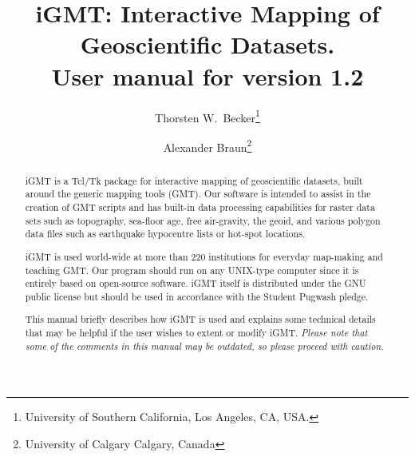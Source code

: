 \documentclass[11pt]{article}
\title{iGMT: Interactive Mapping of Geoscientific
  Datasets.\\User manual for version 1.2}
\author{Thorsten W.\ Becker\thanks{
    University of Southern California, Los Angeles, CA,    USA.} \and 
  Alexander Braun\thanks{University of Calgary
                           Calgary, Canada}}
\begin{document}
\maketitle
\thispagestyle{empty}
\begin{abstract}
  
  iGMT is a Tcl/Tk package for interactive mapping of geoscientific
  datasets, built around the generic mapping tools (GMT). Our software
  is intended to assist in the creation of GMT scripts and has
  built-in data processing capabilities for raster data sets such as
  topography, sea-floor age, free air-gravity, the geoid, and various
  polygon data files such as earthquake hypocentre lists or hot-spot
  locations.
  
  iGMT is used world-wide at more than 220 institutions for everyday
  map-making and teaching GMT. Our program should run on any UNIX-type
  computer since it is entirely based on open-source software.  iGMT
  itself is distributed under the GNU public license but should be
  used in accordance with the Student Pugwash pledge.
  
  This manual briefly describes how iGMT is used and explains some
  technical details that may be helpful if the user wishes to extent
  or modify iGMT. {\em Please note that some of the comments in this
  manual may be outdated, so please proceed with caution.}

\end{abstract}
\clearpage
\tableofcontents
\clearpage
\clearpage
\end{document}
